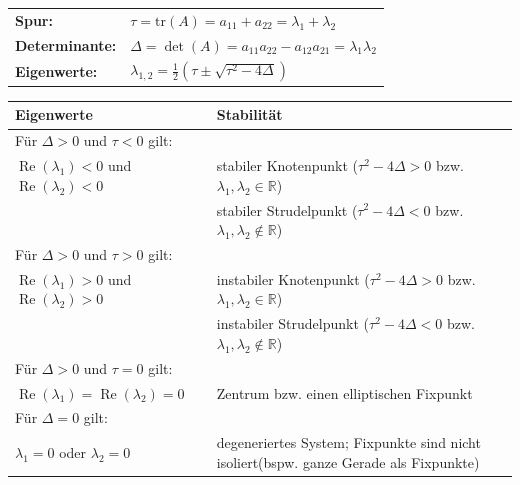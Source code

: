 \begin{tabular}{|p{}|p{}|}
	\hline
	\textbf{Spur:} & $\tau = \mathrm{tr}(A) = a_{11} + a_{22} = \lambda_1 + \lambda_2$ \\
	\textbf{Determinante:} & $\Delta = \det(A) = a_{11}a_{22}  - a_{12}a_{21} = \lambda_1 \lambda_2$\\
	\textbf{Eigenwerte:} & $\lambda_{1,2} = \frac{1}{2} \left(\tau \pm \sqrt{\tau^2 - 4\Delta}\right)$ \\
	\hline
\end{tabular}

\begin{longtable}{|p{}|p{}|}
	\hline 
	\textbf{Eigenwerte} & \textbf{Stabilität}\\
	\hline
	\endhead
	
	\multicolumn{2}{l}{Für $\Delta > 0$ und $\tau < 0$ gilt:} \\
	
	\hline $\operatorname{Re}(\lambda_1) < 0$ und $\operatorname{Re}(\lambda_2) < 0$ & stabiler Knotenpunkt ($\tau^2 - 4 \Delta > 0$ bzw. $ \lambda_1, \lambda_2 \in \mathbb{R}$) \\
	 & stabiler Strudelpunkt ($\tau^2 - 4 \Delta < 0$ bzw. $ \lambda_1, \lambda_2 \notin \mathbb{R}$) \\
	\hline
	
	\multicolumn{2}{l}{Für $\Delta > 0$ und $\tau > 0$ gilt:}\\
	
	\hline $\operatorname{Re}(\lambda_1) > 0$ und $\operatorname{Re}(\lambda_2) > 0$ & instabiler Knotenpunkt ($\tau^2 - 4 \Delta > 0$ bzw. $ \lambda_1, \lambda_2 \in \mathbb{R}$) \\
	 & instabiler Strudelpunkt ($\tau^2 - 4 \Delta < 0$ bzw. $ \lambda_1, \lambda_2 \notin \mathbb{R}$) \\
	\hline
	
	\multicolumn{2}{l}{Für $\Delta > 0$ und $\tau = 0$ gilt:} \\
	
	\hline $\operatorname{Re}(\lambda_1) = \operatorname{Re}(\lambda_2) = 0$ & Zentrum bzw. einen elliptischen Fixpunkt\\
	\hline
	
	\multicolumn{2}{l}{Für $\Delta = 0$ gilt:} \\
	
	\hline $\lambda_1 = 0$ oder $\lambda_2 = 0$ & degeneriertes System; Fixpunkte sind nicht isoliert(bspw. ganze Gerade als Fixpunkte) \\
	\hline
	

\end{longtable}
